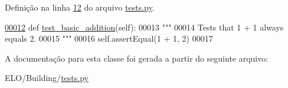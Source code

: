 Definição na linha \hyperlink{tests_8py_source_l00012}{12} do arquivo \hyperlink{tests_8py_source}{tests.\+py}.


\begin{DoxyCode}
\hypertarget{classBuilding_1_1tests_1_1SimpleTest_l00012}{}\hyperlink{classBuilding_1_1tests_1_1SimpleTest_a08b46df0d20de8cbd1dd87605ab2d579}{00012}     \textcolor{keyword}{def }\hyperlink{classBuilding_1_1tests_1_1SimpleTest_a08b46df0d20de8cbd1dd87605ab2d579}{test\_basic\_addition}(self):
00013         \textcolor{stringliteral}{"""}
00014 \textcolor{stringliteral}{        Tests that 1 + 1 always equals 2.}
00015 \textcolor{stringliteral}{        """}
00016         self.assertEqual(1 + 1, 2)
00017 \end{DoxyCode}


A documentação para esta classe foi gerada a partir do seguinte arquivo\+:\begin{DoxyCompactItemize}
\item 
E\+L\+O/\+Building/\hyperlink{tests_8py}{tests.\+py}\end{DoxyCompactItemize}
